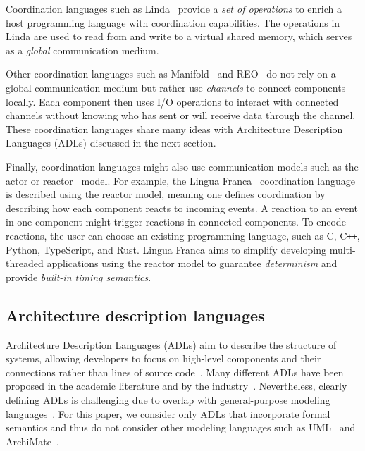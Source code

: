 \documentclass[runningheads]{llncs}
\begin{document}
Coordination languages such as Linda~\cite{carrieroLindaContext1989} provide a \textit{set of operations} to enrich a host programming language with coordination capabilities.
The operations in Linda are used to read from and write to a virtual shared memory, which serves as a \textit{global} communication medium.

Other coordination languages such as Manifold~\cite{arbabOverviewManifoldIts1993,papadopoulosModellingActivitiesInformation1998} and REO~\cite{arbabReoChannelbasedCoordination2004} do not rely on a global communication medium but rather use \textit{channels} to connect components locally.
Each component then uses I/O operations to interact with connected channels without knowing who has sent or will receive data through the channel.
These coordination languages share many ideas with Architecture Description Languages (ADLs) discussed in the next section.

Finally, coordination languages might also use communication models such as the actor or reactor~\cite{lohstrohReactorsDeterministicModel2020} model.
For example, the Lingua Franca~\cite{lohstrohReactorsDeterministicModel2020,lohstrohLinguaFrancaDeterministic2021} coordination language is described using the reactor model, meaning one defines coordination by describing how each component reacts to incoming events.
A reaction to an event in one component might trigger reactions in connected components.
To encode reactions, the user can choose an existing programming language, such as C, C\texttt{++}, Python, TypeScript, and Rust.
Lingua Franca aims to simplify developing multi-threaded applications using the reactor model to guarantee \textit{determinism} and provide \textit{built-in timing semantics}.

\subsection{Architecture description languages} \label{subsec: adl}
Architecture Description Languages (ADLs) aim to describe the structure of systems, allowing developers to focus on high-level components and their connections rather than lines of source code~\cite{clementsSurveyArchitectureDescription1996,medvidovicClassificationComparisonFramework2000,medvidovicFrameworkClassifyingComparing1997}.
Many different ADLs have been proposed in the academic literature and by the industry~\cite{medvidovicClassificationComparisonFramework2000,woodsArchitectureDescriptionLanguages2005}.
Nevertheless, clearly defining ADLs is challenging due to overlap with general-purpose modeling languages~\cite{clementsSurveyArchitectureDescription1996}.
For this paper, we consider only ADLs that incorporate formal semantics and thus do not consider other modeling languages such as UML~\cite{objectmanagementgroupUnifiedModelingLanguage2017} and ArchiMate~\cite{theopengroupArchiMateSpecification2023}.
\end{document}
